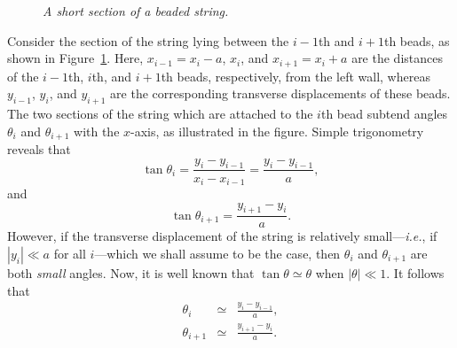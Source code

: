 \begin{figure}
\epsfysize=2.5in
\centerline{}
\caption{\em A short section of a beaded string.}\label{f5.2}   
\end{figure}

Consider the section of the
string lying between the $i-1$th and $i+1$th beads, as shown in Figure~\ref{f5.2}.
Here, $x_{i-1}=x_i-a$, $x_i$, and $x_{i+1}=x_i+a$ are the distances of the $i-1$th, $i$th, and
$i+1$th beads, respectively, 
from the left  wall, whereas $y_{i-1}$, $y_i$, and
$y_{i+1}$ are the corresponding transverse displacements of these beads. 
The  two sections of the string which are attached to the $i$th
bead subtend angles $\theta_i$ and $\theta_{i+1}$ with the $x$-axis, as illustrated
in the figure. Simple trigonometry reveals that
\begin{equation}
\tan\theta_i = \frac{y_i-y_{i-1}}{x_i-x_{i-1}} = \frac{y_i-y_{i-1}}{a},
\end{equation}
and
\begin{equation}
\tan\theta_{i+1} =   \frac{y_{i+1}-y_{i}}{a}.
\end{equation}
However, if the transverse displacement of the string is
relatively small---{\em i.e.}, if $|y_i|\ll a$ for all $i$---which we shall assume to be
the case, then $\theta_i$ and $\theta_{i+1}$ are both {\em small}\/ angles. Now, it is
well known that $\tan\theta\simeq \theta$ when $|\theta|\ll 1$. It follows that
\begin{eqnarray}\label{e5.4}
\theta_i &\simeq & \frac{y_i-y_{i-1}}{a},\\[0.5ex]
\theta_{i+1} &\simeq &  \frac{y_{i+1}-y_{i}}{a}.\label{e5.5}
\end{eqnarray}

